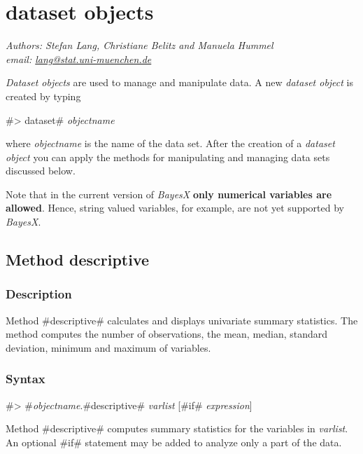 \chapter{dataset objects} \label{chap_data}
\label{datasetobj}  

{\em Authors: Stefan Lang, Christiane Belitz and Manuela Hummel}   \\
{\em email: \href{mailto:lang@stat.uni-muenchen.de}{lang@stat.uni-muenchen.de}}\\
\vspace{0.3cm}


{\em Dataset objects} are used to manage and manipulate data. A new {\em dataset object} is created by typing

#> dataset# {\em objectname}

where {\em objectname} is the name of the data set. After the
creation of a {\em dataset object} you can apply the methods for
manipulating and managing data sets discussed below.

Note that in the current version of {\em BayesX} {\bf only
numerical variables are allowed}. Hence, string valued variables,
for example,  are not yet supported by {\em BayesX}.

\section{Method descriptive}
\label{descriptive} 
 

\subsection*{Description}

Method #descriptive# calculates and displays univariate summary
statistics. The method computes the number of observations, the
mean, median, standard deviation, minimum and maximum of
variables.

\subsection*{Syntax}

#> #{\em objectname}.#descriptive# {\em varlist} [#if# {\em expression}]

Method #descriptive# computes summary statistics for the variables
in {\em varlist}. An optional #if# statement may be added to
analyze only a part of the data.

